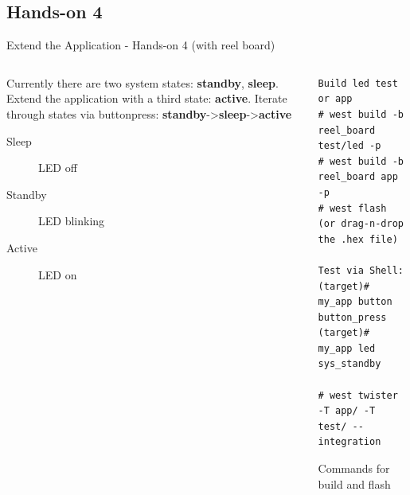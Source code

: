 \documentclass[10pt, aspectratio=169]{beamer}
\begin{document}
\subsection{Hands-on 4}
\begin{frame}[fragile]{Extend the Application - Hands-on 4 (with reel board)}
  \begin{columns}
    \begin{column}{0.6\textwidth}
      Currently there are two system states: \textbf{standby}, \textbf{sleep}.
      Extend the application with a third state: \textbf{active}. Iterate
      through states via buttonpress:
      \textbf{standby}->\textbf{sleep}->\textbf{active}\footnotemark
      \begin{description}
        \item [Sleep] LED off
        \item [Standby] LED blinking
        \item [Active] LED on
      \end{description}
    \end{column}
    \begin{column}{0.4\textwidth}
      \begin{listing}[H]
        \begin{verbatim}
Build led test or app
# west build -b reel_board test/led -p
# west build -b reel_board app -p
# west flash (or drag-n-drop the .hex file)

Test via Shell:
(target)# my_app button button_press
(target)# my_app led sys_standby

# west twister -T app/ -T test/ --integration

        \end{verbatim}
        \caption{\footnotesize{Commands for build and flash}}
      \end{listing}
    \end{column}
  \end{columns}
\end{frame}
\end{document}
